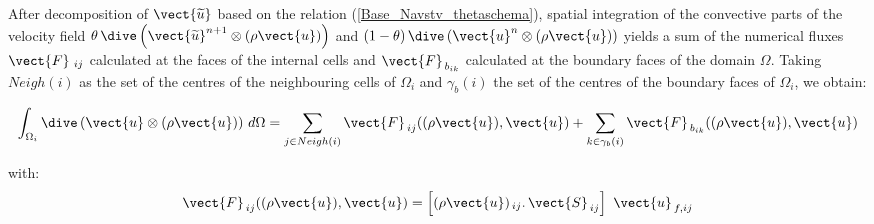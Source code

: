 After decomposition of $\vect{\widetilde{u}}$ based on the relation
(\ref{Base_Navstv_thetaschema}), spatial integration of the convective
parts of the velocity field $\theta\,{\dive\left(\vect{\widetilde{u}}^{n+1}\otimes
(\rho \vect{u})\right)}$ and $(1-\theta)\,{\dive\left(
\vect{u}^{n}\otimes (\rho \vect{u})\right)}$ yields a sum of the numerical
fluxes ${\vect{F}\,_{\,ij}}$ calculated at the faces of the internal cells and ${\vect{F}_{\,b_{ik}}}$ calculated at the boundary faces of the domain $\Omega$.
Taking $Neigh(i)$ as the set of the centres of the neighbouring cells of
${\Omega_i}$ and $\gamma_b(i)$ the set of the centres of the boundary faces of
${\Omega_i}$, we obtain:

\begin{equation}\notag
\int_{\Omega_i}{\dive\left(\vect{u}\otimes (\rho \vect{u})\right)\, d\Omega} =
\sum_{j\in Neigh(i)}{\vect{F}_{\,ij}((\rho \vect{u}), \vect{u})} \\
+\sum_{k\in {\gamma_b(i)}} {\vect{F}_{\,{b}_{ik}}((\rho \vect{u}),\vect{u})}
\end{equation}

with:
\begin{equation}
\vect{F}_{\,ij}((\rho \vect{u}), \vect{u}) = \left[{(\rho \vect{u})_{\,ij}} \text{.}\, \vect{S}_{\,ij}\right]
\ \vect{u}_{\,f,ij}
\end{equation}

